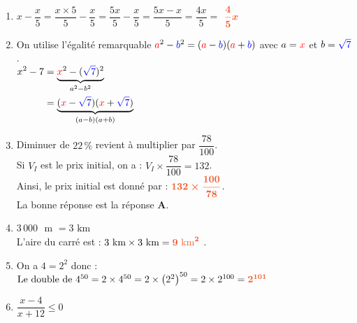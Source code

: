 \documentclass[a4paper,11pt]{article}
\newcounter{seancenum}
\begin{document}
\setcounter{seancenum}{25}
\newpage
\begin{seance}{} %

\begin{enumerate}
\item $x-\dfrac{x}{5}=\dfrac{x\times 5}{5}-\dfrac{x}{5}=\dfrac{5x}{5}-\dfrac{x}{5}=\dfrac{5x-x}{5}=\dfrac{4x}{5}=$ ${\color[HTML]{f15929}\boldsymbol{\dfrac{4}{5}x}}$

\item On utilise l'égalité remarquable ${\color{red} a}^2-{\color{blue} b}^2=({\color{red} a}-{\color{blue} b})({\color{red} a}+{\color{blue} b})$ avec $a={\color{red} x}$  et $b={\color{blue} \sqrt{7}}$.\\$\begin{aligned}
         x^2-7&=\underbrace{{\color{red} x}^2-({\color{blue} \sqrt{7}})^2}_{a^2-b^2}\\
         &=\underbrace{({\color{red} x}-{\color{blue} \sqrt{7}})({\color{red} x}+{\color{blue} \sqrt{7}})}_{(a-b)(a+b)}
         \end{aligned}$ 

\item  Diminuer de $22\,\%$ revient à multiplier par $\dfrac{78}{100}$.\\
Si $V_I$ est le prix initial, on a : $V_I \times \dfrac{78}{100}=132$.\\
Ainsi, le prix initial est donné par : ${\color[HTML]{f15929}\boldsymbol{132 \times \dfrac{100}{78}}}$.\\La bonne réponse est la réponse {\bfseries \color[HTML]{f15929}A}.

\item $3\,000$ $\text{ m}$ $= 3$ $\text{km}$\\
L'aire du carré est : $3 \text{ km}\times 3 \text{ km} = {\color[HTML]{f15929}\boldsymbol{9\text{ km}^2}}$ .

\item  On a $4=2^{2}$ donc :\\
    $
    \text{Le double de  } 4^{50}  = 2 \times 4^{50} 
     = 2\times  \left(2^{2}\right)^{50} 
    =2\times  2^{100} 
    ={\color[HTML]{f15929}\boldsymbol{2^{101}}} 
$

\item $\dfrac{x-4}{x+12} \leqslant 0$\\
\medskip


\end{enumerate}
\end{seance}
\end{document}
